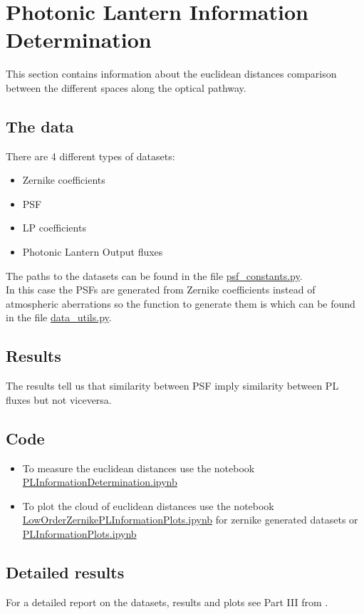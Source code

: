 \section{Photonic Lantern Information Determination}

	This section contains information about the euclidean distances comparison between the different spaces along the optical pathway.
	
	\subsection{The data}
		
		There are 4 different types of datasets:
		\begin{itemize}
			\item Zernike coefficients
			\item PSF
			\item LP coefficients
			\item Photonic Lantern Output fluxes
		\end{itemize}
		
		The paths to the datasets can be found in the file \href{https://github.com/Dacarpe03/PLImageReconstruction/blob/main/Utils/psf_constants.py}{psf\_constants.py}.\\
		
		In this case the PSFs are generated from Zernike coefficients instead of atmospheric aberrations so the function to generate them is  which can be found in the file  \href{https://github.com/Dacarpe03/PLImageReconstruction/blob/main/Utils/data_utils.py}{data\_utils.py}.\\
		
	\subsection{Results}
		
		The results tell us that similarity between PSF imply similarity between PL fluxes but not viceversa.
		
	\subsection{Code}
		\begin{itemize}
			\item To measure the euclidean distances use the notebook \href{https://github.com/Dacarpe03/PLImageReconstruction/blob/main/PSFReconstruction/DataNotebooks/PLInformationDetermination.ipynb}{PLInformationDetermination.ipynb}
			\item To plot the cloud of euclidean distances use the notebook \href{https://github.com/Dacarpe03/PLImageReconstruction/blob/main/PSFReconstruction/Plots/LowOrderZernikePLInformationPlots.ipynb}{LowOrderZernikePLInformationPlots.ipynb} for zernike generated datasets or \href{https://github.com/Dacarpe03/PLImageReconstruction/blob/main/PSFReconstruction/Plots/PLInformationPlots.ipynb}{PLInformationPlots.ipynb}
		\end{itemize}
		
	\subsection{Detailed results}
	
		For a detailed report on the datasets, results and plots see Part III from .
		